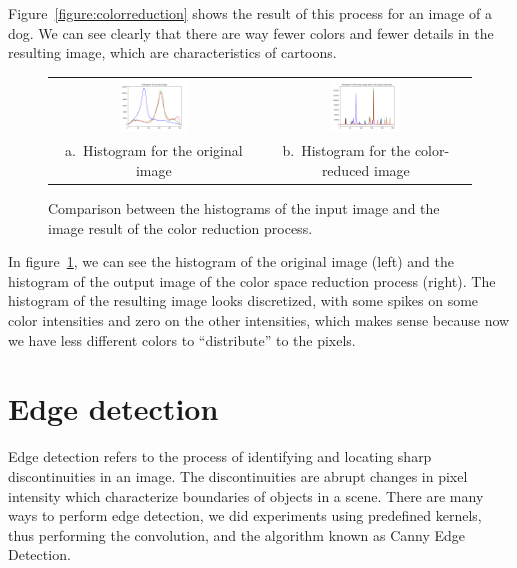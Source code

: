\documentclass[]{IEEEtran}
\begin{document}
  Figure~\ref{figure:colorreduction} shows the result of this process for an
  image of a dog. We can see clearly that there are way fewer colors and fewer
  details in the resulting image, which are characteristics of cartoons.

  \begin{figure}[t]
    \centering
    \begin{tabular}{c c}
    \includegraphics[width=0.35\textwidth]{./figures/3/dog-3-1-2-hist.png} &
    \includegraphics[width=0.35\textwidth]{./figures/3/dog-3-1-2-color-hist.png} \\
    a.~Histogram for the original image & b.~Histogram for the color-reduced image
    \end{tabular}
    \caption{Comparison between the histograms of the input image and the image
    result of the color reduction process.}
    \label{figure:colorreductionhist}
  \end{figure}

  In figure~\ref{figure:colorreductionhist}, we can see the histogram of the
  original image (left) and the histogram of the output image of the color
  space reduction process (right). The histogram of the resulting image looks
  discretized, with some spikes on some color intensities and zero on the other
  intensities, which makes sense because now we have less different colors to
  ``distribute'' to the pixels.

  \section{Edge detection}
  Edge detection refers to the process of identifying and locating sharp discontinuities in an image. The discontinuities are abrupt changes in pixel intensity which characterize boundaries of objects in a scene\cite{b4}. There are many ways to perform edge detection, we did experiments using predefined kernels, thus performing the convolution, and the algorithm known as Canny Edge Detection\cite{b5}.
  
\end{document}
